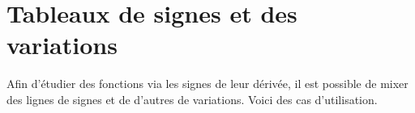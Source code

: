 \documentclass[10pt, a4paper]{article}
\begin{document}
\section{Tableaux de signes et des variations}

Afin d'étudier des fonctions via les signes de leur dérivée, il est possible de mixer des lignes de signes et de d'autres de variations. Voici des cas d'utilisation.
 
\end{document}
